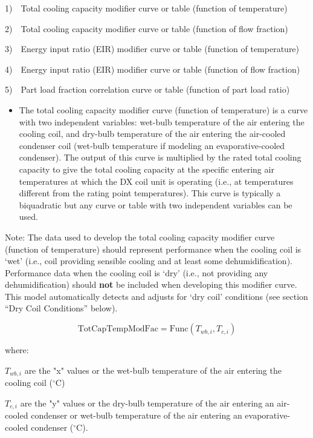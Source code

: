 1)~~Total cooling capacity modifier curve or table (function of temperature)

2)~~Total cooling capacity modifier curve or table (function of flow fraction)

3)~~Energy input ratio (EIR) modifier curve or table (function of temperature)

4)~~Energy input ratio (EIR) modifier curve or table (function of flow fraction)

5)~~Part load fraction correlation curve or table (function of part load ratio)

\begin{itemize}
\tightlist
\item
  The total cooling capacity modifier curve (function of temperature) is a curve with two independent variables: wet-bulb temperature of the air entering the cooling coil, and dry-bulb temperature of the air entering the air-cooled condenser coil (wet-bulb temperature if modeling an evaporative-cooled condenser). The output of this curve is multiplied by the rated total cooling capacity to give the total cooling capacity at the specific entering air temperatures at which the DX coil unit is operating (i.e., at temperatures different from the rating point temperatures). This curve is typically a biquadratic but any curve or table with two independent variables can be used.
\end{itemize}

Note: The data used to develop the total cooling capacity modifier curve (function of temperature) should represent performance when the cooling coil is `wet' (i.e., coil providing sensible cooling and at least some dehumidification). Performance data when the cooling coil is `dry' (i.e., not providing any dehumidification) should \textbf{not} be included when developing this modifier curve. This model automatically detects and adjusts for `dry coil' conditions (see section ``Dry Coil Conditions'' below).

\begin{equation}
\text{TotCapTempModFac} = \text{Func}\left(T_{wb,i},T_{c,i}\right)
\label{eq:TotCapTempModFac}
\end{equation}

where:

\({T_{wb,i}}\) are the "x" values or the wet-bulb temperature of the air entering the cooling coil (\(^{\circ}\)C)

\({T_{c,i}}\) are the "y" values or the dry-bulb temperature of the air entering an air-cooled condenser or wet-bulb temperature of the air entering an evaporative-cooled condenser (\(^{\circ}\)C).

